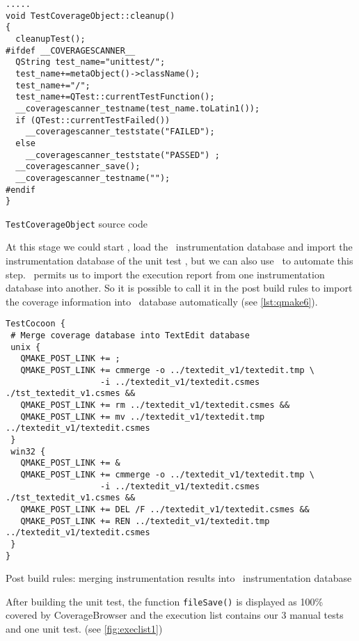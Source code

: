 \begin{listings}[H]
  \scriptsize
\begin{verbatim}
.....
void TestCoverageObject::cleanup()
{
  cleanupTest();
#ifdef __COVERAGESCANNER__
  QString test_name="unittest/";
  test_name+=metaObject()->className();
  test_name+="/";
  test_name+=QTest::currentTestFunction();
  __coveragescanner_testname(test_name.toLatin1());
  if (QTest::currentTestFailed())
    __coveragescanner_teststate("FAILED"); 
  else 
    __coveragescanner_teststate("PASSED") ; 
  __coveragescanner_save();
  __coveragescanner_testname(""); 
#endif
}
\end{verbatim}
\caption{\texttt{TestCoverageObject} source code}
\label{lst:src6}
\end{listings}

At this stage we could start \CoverageBrowser, load the \TextEdit\ instrumentation
database and import the instrumentation database of the unit test
, but we can also use \cmmerge\ to
automate this step. \cmmerge\ permits us  to import the execution report from one
instrumentation database into another. So it is possible to call it in
the post build rules to import the coverage information into \TextEdit\
database automatically (see \autoref{lst:qmake6}).

\begin{listings}[H]
  \scriptsize
\begin{verbatim}
TestCocoon {
 # Merge coverage database into TextEdit database
 unix {
   QMAKE_POST_LINK += ;
   QMAKE_POST_LINK += cmmerge -o ../textedit_v1/textedit.tmp \
                   -i ../textedit_v1/textedit.csmes ./tst_textedit_v1.csmes &&
   QMAKE_POST_LINK += rm ../textedit_v1/textedit.csmes &&
   QMAKE_POST_LINK += mv ../textedit_v1/textedit.tmp ../textedit_v1/textedit.csmes 
 }
 win32 {
   QMAKE_POST_LINK += &
   QMAKE_POST_LINK += cmmerge -o ../textedit_v1/textedit.tmp \
                   -i ../textedit_v1/textedit.csmes ./tst_textedit_v1.csmes &&
   QMAKE_POST_LINK += DEL /F ../textedit_v1/textedit.csmes &&
   QMAKE_POST_LINK += REN ../textedit_v1/textedit.tmp ../textedit_v1/textedit.csmes 
 }
}
\end{verbatim}
\caption{Post build rules: merging instrumentation results into \TextEdit\ instrumentation database}
\label{lst:qmake6}
\end{listings}

After building the unit test, the function \verb$fileSave()$ is displayed as
100\% covered by CoverageBrowser and the execution list contains our 3 manual
tests and one unit test. (see \autoref{fig:execlist1})

